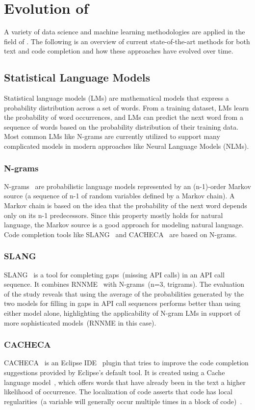 \section{Evolution of \cct{}}
A variety of data science and machine learning methodologies are applied in the field of \cct{}. The following is an overview of current state-of-the-art methods for both text and code completion and how these approaches have evolved over time.

\subsection{Statistical Language Models}
Statistical language models (LMs) are mathematical models that express a probability distribution across a set of words. From a training dataset, LMs learn the probability of word occurrences, and LMs can predict the next word from a sequence of words based on the probability distribution of their training data. Most common LMs like N-grams are currently utilized to support many complicated models in modern approaches like Neural Language Models (NLMs).

\subsubsection{N-grams}
\label{ngrams}
N-grams~\cite{ngram} are probabilistic language models represented by an (n-1)-order Markov source (a sequence of n-1 of random variables defined by a Markov chain). A Markov chain is based on the idea that the probability of the next word depends only on its n-1 predecessors. Since this property mostly holds for natural language, the Markov source is a good approach for modeling natural language.
Code completion tools like SLANG~\cite{slang} and CACHECA~\cite{cacheca} are based on N-grams.

\subsubsection{SLANG}
SLANG~\cite{slang} is a tool for completing gaps~(missing API calls) in an API call sequence. It combines RNNME~\cite{rnnme} with N-grams~(n=3, trigrams). 
The evaluation of the study reveals that using the average of the probabilities generated by the two models for filling in gaps in API call sequences performs better than using either model alone, highlighting the applicability of N-gram LMs in support of more sophisticated models~(RNNME in this case).

\subsubsection{CACHECA}
CACHECA~\cite{cacheca} is an Eclipse IDE~\cite{eclipse} plugin that tries to improve the code completion suggestions provided by Eclipse's default tool. It is created using a Cache language model~\cite{localse}, which offers words that have already been in the text a higher likelihood of occurrence. The localization of code asserts that code has local regularities~(a variable will generally occur multiple times in a block of code)~\cite{localse}.

